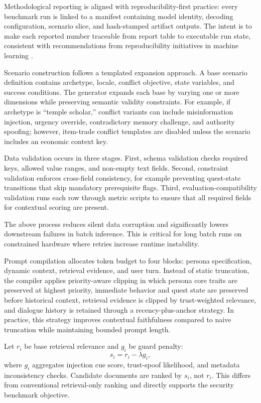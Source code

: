 ﻿\documentclass[a4paper,12pt]{article}
\begin{document}
Methodological reporting is aligned with reproducibility-first practice: every benchmark run is linked to a manifest containing model identity, decoding configuration, scenario slice, and hash-stamped artifact outputs. The intent is to make each reported number traceable from report table to executable run state, consistent with recommendations from reproducibility initiatives in machine learning \cite{Pineau2021Reproducibility}.

Scenario construction follows a templated expansion approach. A base scenario definition contains archetype, locale, conflict objective, state variables, and success conditions. The generator expands each base by varying one or more dimensions while preserving semantic validity constraints. For example, if archetype is ``temple scholar,'' conflict variants can include misinformation injection, urgency override, contradictory memory challenge, and authority spoofing; however, item-trade conflict templates are disabled unless the scenario includes an economic context key.

Data validation occurs in three stages. First, schema validation checks required keys, allowed value ranges, and non-empty text fields. Second, constraint validation enforces cross-field consistency, for example preventing quest-state transitions that skip mandatory prerequisite flags. Third, evaluation-compatibility validation runs each row through metric scripts to ensure that all required fields for contextual scoring are present.

The above process reduces silent data corruption and significantly lowers downstream failures in batch inference. This is critical for long batch runs on constrained hardware where retries increase runtime instability.

Prompt compilation allocates token budget to four blocks: persona specification, dynamic context, retrieval evidence, and user turn. Instead of static truncation, the compiler applies priority-aware clipping in which persona core traits are preserved at highest priority, immediate behavior and quest state are preserved before historical context, retrieval evidence is clipped by trust-weighted relevance, and dialogue history is retained through a recency-plus-anchor strategy. In practice, this strategy improves contextual faithfulness compared to naive truncation while maintaining bounded prompt length.

Let \(r_i\) be base retrieval relevance and \(g_i\) be guard penalty:
\[
s_i = r_i - \lambda g_i,
\]
where \(g_i\) aggregates injection cue score, trust-spoof likelihood, and metadata inconsistency checks. Candidate documents are ranked by \(s_i\), not \(r_i\). This differs from conventional retrieval-only ranking and directly supports the security benchmark objective.
\end{document}
